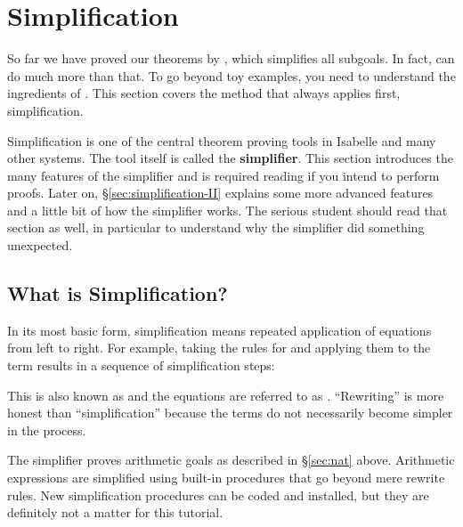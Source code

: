 \section{Simplification}
\label{sec:Simplification}

So far we have proved our theorems by , which simplifies
all subgoals. In fact,  can do much more than that. 
To go beyond toy examples, you
need to understand the ingredients of .  This section covers the
method that  always applies first, simplification.

Simplification is one of the central theorem proving tools in Isabelle and
many other systems. The tool itself is called the \textbf{simplifier}. 
This section introduces the many features of the simplifier
and is required reading if you intend to perform proofs.  Later on,
{\S}\ref{sec:simplification-II} explains some more advanced features and a
little bit of how the simplifier works. The serious student should read that
section as well, in particular to understand why the simplifier did
something unexpected.

\subsection{What is Simplification?}

In its most basic form, simplification means repeated application of
equations from left to right. For example, taking the rules for \isa{\at}
and applying them to the term \isa{[0,1] \at\ []} results in a sequence of
simplification steps:
This is also known as  and the
equations are referred to as .
``Rewriting'' is more honest than ``simplification'' because the terms do not
necessarily become simpler in the process.

The simplifier proves arithmetic goals as described in
{\S}\ref{sec:nat} above.  Arithmetic expressions are simplified using built-in
procedures that go beyond mere rewrite rules.  New simplification procedures
can be coded and installed, but they are definitely not a matter for this
tutorial. 




